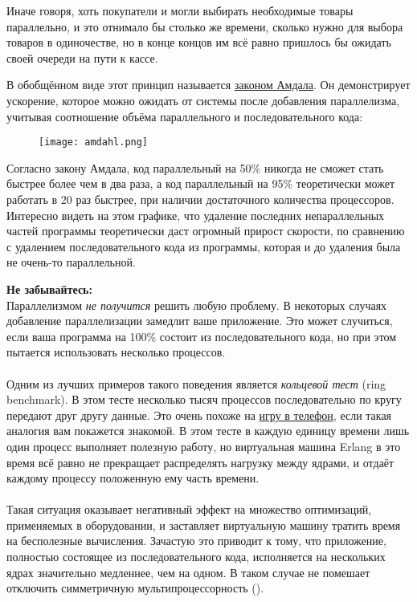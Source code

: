 Иначе говоря, хоть покупатели и могли выбирать необходимые товары параллельно, и это отнимало бы столько же времени, сколько нужно для выбора товаров в одиночестве, но в конце концов им всё равно пришлось бы ожидать своей очереди на пути к кассе.

В обобщённом виде этот принцип называется \href{http://en.wikipedia.org/wiki/Amdahl\%27s_law}{законом Амдала}.
Он демонстрирует ускорение, которое можно ожидать от системы после добавления параллелизма, учитывая соотношение объёма параллельного и последовательного кода:

\begin{figure}[h!]
    \centering
    \texttt{[image: amdahl.png]}
\end{figure}
Согласно закону Амдала, код параллельный на 50\% никогда не сможет стать быстрее более чем в два раза, а код параллельный на 95\% теоретически может работать в 20 раз быстрее, при наличии достаточного количества процессоров.
Интересно видеть на этом графике, что удаление последних непараллельных частей программы теоретически даст огромный прирост скорости, по сравнению с удалением последовательного кода из программы, которая и до удаления была не очень\--то параллельной.\\
\colorbox{lorange}
{
\begin{minipage}{1.0\linewidth}
    \textbf{Не забывайтесь:}\\
    Параллелизмом \emph{не получится} решить любую проблему.
    В некоторых случаях добавление параллелизации замедлит ваше приложение.
    Это может случиться, если ваша программа на 100\% состоит из последовательного кода, но при этом пытается использовать несколько процессов.\\
    \\
    Одним из лучших примеров такого поведения является \emph{кольцевой тест} (ring benchmark).
    В этом тесте несколько тысяч процессов последовательно по кругу передают друг другу данные.
    Это очень похоже на \href{http://en.wikipedia.org/wiki/Telephone_game}{игру в телефон}, если такая аналогия вам покажется знакомой.
    В этом тесте в каждую единицу времени лишь один процесс выполняет полезную работу, но виртуальная машина Erlang в это время всё равно не прекращает распределять нагрузку между ядрами, и отдаёт каждому процессу положенную ему часть времени.\\
    \\
    Такая ситуация оказывает негативный эффект на множество оптимизаций, применяемых в оборудовании, и заставляет виртуальную машину тратить время на бесполезные вычисления.
    Зачастую это приводит к тому, что приложение, полностью состоящее из последовательного кода, исполняется на нескольких ядрах значительно медленнее, чем на одном.
    В таком случае не помешает отключить симметричную мультипроцессорность ().
\end{minipage}
}
